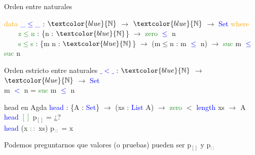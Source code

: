 \documentclass[xcolor=dvipsnames]{beamer} %
\newcommand{\cf}[1]{\textcolor{blue}{#1}}
\newcommand{\ct}[1]{\textcolor{blue}{#1}}
\newcommand{\cc}[1]{\textcolor{ForestGreen}{#1}}
\newcommand{\ck}[1]{\textcolor{orange}{#1}}
\newcommand{\N}{\ct{\mathbb{N}}}
\newcommand{\ra}{\rightarrow}
\begin{document}
\begin{frame}

\begin{block}{Orden entre naturales}

\ck{data} \ct{\_$\leq$\_} : $\N$ $\ra$ $\N$ $\ra$ \ct{Set} \ck{where}\\
\ \ \ \ \cc{z$\leq$n} : \{n : $\N$\}                 $\ra$ \cc{zero}  \ct{$\leq$} n\\
\ \ \ \ \cc{s$\leq$s} : \{m n : $\N$\} $\ra$ (m$\leq$n : m \ct{$\leq$} n) $\ra$ \cc{suc} m \ct{$\leq$} \cc{suc} n

\end{block}

\begin{block}{Orden estricto entre naturales}
\cf{$\_<\_$} : $\N$ $\ra$ $\N$ $\ra$ \ct{Set}\\
m \cf{$<$} n = \cc{suc} m \cf{$\leq$} n
\end{block}

\begin{block}{head en Agda}
    \cf{head} : \{A : \ct{Set}\}  $\ra$ (xs : \ct{List} A) $\ra$ 
    \cc{zero} $<$ \ct{length} xs $\rightarrow$ A \\
    \cf{head} \cc{$[]$} p$_{[]}$ = ¿?\\
    \cf{head} (x \cc{$::$} xs) p$_{::}$ = x
  \end{block}  

\pause

\begin{block}{}
Podemos preguntarnos que valores (o pruebas) pueden ser p$_{[]}$ y p$_{::}$
\end{block}

\end{frame}
\end{document}
